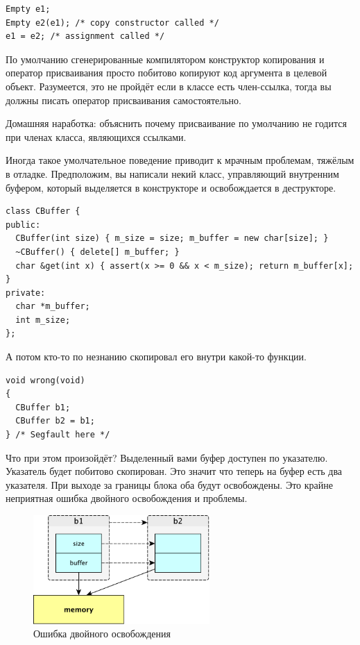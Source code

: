 \documentclass[a4paper,12pt,oneside]{article}
\begin{document}
\begin{lstlisting}
Empty e1;
Empty e2(e1); /* copy constructor called */
e1 = e2; /* assignment called */
\end{lstlisting}

По умолчанию сгенерированные компилятором конструктор копирования и оператор присваивания просто побитово копируют код аргумента в целевой объект. Разумеется, это не пройдёт если в классе есть член-ссылка, тогда вы должны писать оператор присваивания самостоятельно.

Домашняя наработка: объяснить почему присваивание по умолчанию не годится при членах класса, являющихся ссылками.

Иногда такое умолчательное поведение приводит к мрачным проблемам, тяжёлым в отладке. Предположим, вы написали некий класс, управляющий внутренним буфером, который выделяется в конструкторе и освобождается в деструкторе.

\begin{lstlisting}
class CBuffer {
public:
  CBuffer(int size) { m_size = size; m_buffer = new char[size]; }
  ~CBuffer() { delete[] m_buffer; }
  char &get(int x) { assert(x >= 0 && x < m_size); return m_buffer[x]; } 
private:
  char *m_buffer;
  int m_size;
};
\end{lstlisting}

А потом кто-то по незнанию скопировал его внутри какой-то функции.

\begin{lstlisting}
void wrong(void)
{
  CBuffer b1;
  CBuffer b2 = b1;
} /* Segfault here */
\end{lstlisting}

Что при этом произойдёт? Выделенный вами буфер доступен по указателю. Указатель будет побитово скопирован. Это значит что теперь на буфер есть два указателя. При выходе за границы блока оба будут освобождены. Это крайне неприятная ошибка двойного освобождения и проблемы.

\begin{figure}[h!]
\centering
\includegraphics[width=0.6\textwidth]{illustrations/copying-crop.pdf}
\caption{Ошибка двойного освобождения}
\label{fig:copying-crop}
\end{figure}
\end{document}
